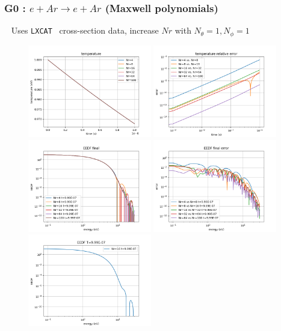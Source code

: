 \documentclass[mathserif, aspectratio=169]{beamer}
\newcommand{\lxcat}{\texttt{LXCAT}}
\begin{document}
	\begin{frame}
		\frametitle{G0 : $e + Ar \rightarrow e + Ar$ (Maxwell polynomials)}
		\textbullet~ Uses \lxcat~ cross-section data, increase $Nr$ with $N_\theta=1,N_\phi=1$
		\begin{figure}
			\only<+>
			{
				\includegraphics[width=0.48\textwidth]{g0_mw_temp.png}
				\includegraphics[width=0.48\textwidth]{g0_mw_temp_error.png}
			}
			\only<+>
			{
				\includegraphics[width=0.48\textwidth]{g0_mw_eedf_final.png}
				\includegraphics[width=0.48\textwidth]{g0_mw_eedf_final_error.png}
			}
			\only<+>
			{
				\includegraphics[width=0.48\textwidth]{g0_mw_nr16_eedf.png}
}
\end{figure}
\end{frame}
\end{document}
